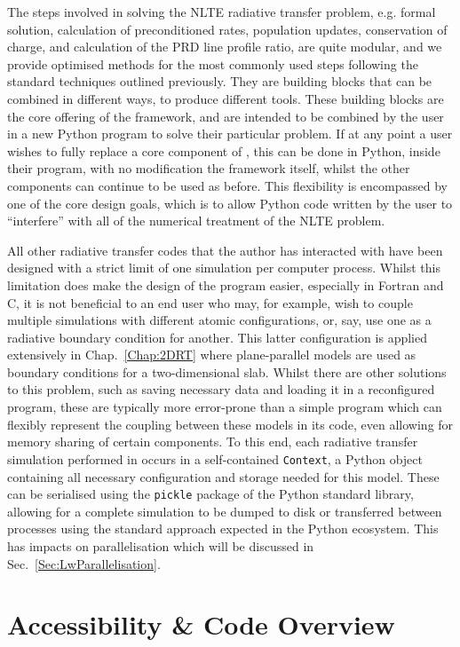 The steps involved in solving the NLTE radiative transfer problem, e.g. formal solution, calculation of preconditioned rates, population updates, conservation of charge, and calculation of the PRD line profile ratio, are quite modular, and we provide optimised methods for the most commonly used steps following the standard techniques outlined previously.
They are building blocks that can be combined in different ways, to produce different tools.
These building blocks are the core offering of the \Lw{} framework, and are intended to be combined by the user in a new Python program to solve their particular problem.
If at any point a user wishes to fully replace a core component of \Lw{}, this can be done in Python, inside their program, with no modification the framework itself, whilst the other components can continue to be used as before.
This flexibility is encompassed by one of the core design goals, which is to allow Python code written by the user to ``interfere'' with all of the numerical treatment of the NLTE problem.

All other radiative transfer codes that the author has interacted with have been designed with a strict limit of one simulation per computer process.
Whilst this limitation does make the design of the program easier, especially in Fortran and C, it is not beneficial to an end user who may, for example, wish to couple multiple simulations with different atomic configurations, or, say, use one as a radiative boundary condition for another.
This latter configuration is applied extensively in Chap.~\ref{Chap:2DRT} where plane-parallel models are used as boundary conditions for a two-dimensional slab.
Whilst there are other solutions to this problem, such as saving necessary data and loading it in a reconfigured program, these are typically more error-prone than a simple program which can flexibly represent the coupling between these models in its code, even allowing for memory sharing of certain components.
To this end, each radiative transfer simulation performed in \Lw{} occurs in a self-contained \texttt{Context}, a Python object containing all necessary configuration and storage needed for this model.
These can be serialised using the \texttt{pickle} package of the Python standard library, allowing for a complete simulation to be dumped to disk or transferred between processes using the standard approach expected in the Python ecosystem.
This has impacts on parallelisation which will be discussed in Sec.~\ref{Sec:LwParallelisation}.

\section{Accessibility \& Code Overview}\label{Sec:LwCodeOverview}

